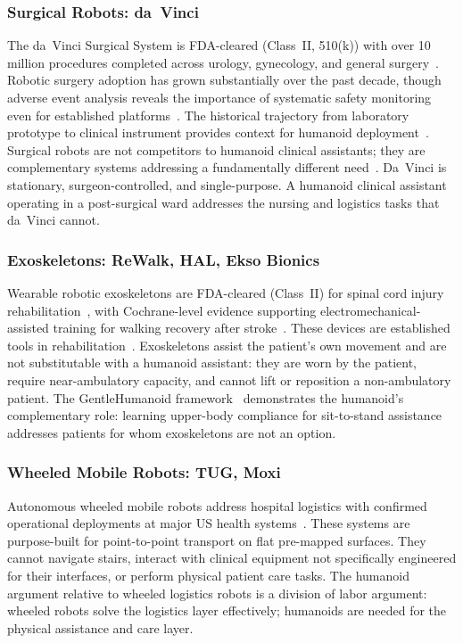 \documentclass[acmsmall]{acmart}
\begin{document}
\subsubsection{Surgical Robots: da~Vinci}

The da~Vinci Surgical System is FDA-cleared (Class~II, 510(k)) with over 10
million procedures completed across urology, gynecology, and general
surgery~\cite{lanfranco2004robotic,sheetz2020robotic}. Robotic surgery adoption
has grown substantially over the past decade, though adverse event analysis
reveals the importance of systematic safety monitoring even for established
platforms~\cite{alemzadeh2016adverse}. The historical trajectory from laboratory
prototype to clinical instrument provides context for humanoid
deployment~\cite{camarillo2004robotic}. Surgical robots are not competitors to
humanoid clinical assistants; they are complementary systems addressing a
fundamentally different need~\cite{morgan2022robots}. Da~Vinci is stationary, surgeon-controlled, and single-purpose.
A humanoid clinical assistant operating in a post-surgical ward addresses the
nursing and logistics tasks that da~Vinci cannot.

\subsubsection{Exoskeletons: ReWalk, HAL, Ekso Bionics}

Wearable robotic exoskeletons are FDA-cleared (Class~II) for spinal cord injury
rehabilitation~\cite{esquenazi2012rewalk}, with Cochrane-level evidence supporting
electromechanical-assisted training for walking recovery after
stroke~\cite{mehrholz2017electromechanical}.
These devices are established tools in rehabilitation~\cite{sorensen2025humanoid}. Exoskeletons assist the patient's own
movement and are not substitutable with a humanoid assistant: they are worn by
the patient, require near-ambulatory capacity, and cannot lift or reposition a
non-ambulatory patient. The GentleHumanoid framework~\cite{lu2025gentlehumanoid}
demonstrates the humanoid's complementary role: learning upper-body compliance
for sit-to-stand assistance addresses patients for whom exoskeletons are not an
option.

\subsubsection{Wheeled Mobile Robots: TUG, Moxi}

Autonomous wheeled mobile robots address hospital logistics with confirmed
operational deployments at major US health systems~\cite{huang2023intelligent,morgan2022robots}.
These systems are purpose-built for point-to-point transport on flat pre-mapped
surfaces. They cannot navigate stairs, interact with clinical equipment not
specifically engineered for their interfaces, or perform physical patient care
tasks. The humanoid argument relative to wheeled logistics robots is a division
of labor argument: wheeled robots solve the logistics layer effectively;
humanoids are needed for the physical assistance and care layer.
\end{document}
